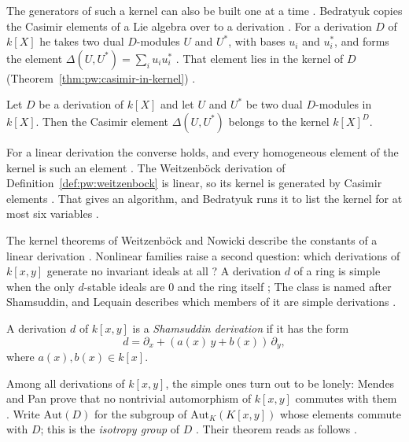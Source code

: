The generators of such a kernel can also be built one at a time
\cite[p.~2]{Bedratyuk2005Casimir}. Bedratyuk copies the Casimir elements of a
Lie algebra over to a derivation \cite[p.~2]{Bedratyuk2005Casimir}. For a
derivation $D$ of $k[X]$ he takes two dual $D$-modules $U$ and $U^{*}$, with
bases $u_{i}$ and $u^{*}_{i}$, and forms the element
$\Delta(U,U^{*})=\sum_{i}u_{i}u^{*}_{i}$ \cite[Definition~2.4,
p.~2]{Bedratyuk2005Casimir}. That element lies in the kernel of $D$
(Theorem~\ref{thm:pw:casimir-in-kernel}) \cite[Theorem~2.2,
p.~2]{Bedratyuk2005Casimir}.

\begin{theorem}\label{thm:pw:casimir-in-kernel}
Let $D$ be a derivation of $k[X]$ and let $U$ and $U^{*}$ be two dual
$D$-modules in $k[X]$. Then the Casimir element $\Delta(U,U^{*})$ belongs to
the kernel $k[X]^{D}$.
\end{theorem}

For a linear derivation the converse holds, and every homogeneous element of
the kernel is such an element
\cite[Theorem~2.3, pp.~2--3]{Bedratyuk2005Casimir}. The Weitzenb\"ock
derivation of Definition~\ref{def:pw:weitzenbock} is linear, so its kernel is
generated by Casimir elements \cite[pp.~3--4]{Bedratyuk2005Casimir}. That
gives an algorithm, and Bedratyuk runs it to list the kernel for at most six
variables \cite[p.~1]{Bedratyuk2005Casimir}.

The kernel theorems of Weitzenb\"ock and Nowicki describe the constants of a
linear derivation \cite[p.~21]{Freudenburg2017}. Nonlinear families raise a second question: which
derivations of $k[x,y]$ generate no invariant ideals at all
\cite[p.~2031]{Baltazar2016}? A derivation $d$ of a ring is simple when the
only $d$-stable ideals are $0$ and the ring itself
\cite[p.~2031]{Baltazar2016}; The class is named after Shamsuddin, and Lequain
describes which members of it are simple derivations
\cite[pp.~801--807]{Lequain2008Simple}.

\begin{definition}\label{def:pw:shamsuddin}
A derivation $d$ of $k[x,y]$ is a \emph{Shamsuddin derivation} if it has
the form
\begin{equation*}
d=\partial_{x}+(a(x)\,y+b(x))\,\partial_{y},
\end{equation*}
where $a(x),b(x)\in k[x]$.
\end{definition}

Among all derivations of $k[x,y]$, the simple ones turn out to be lonely:
Mendes and Pan prove that no nontrivial automorphism of $k[x,y]$ commutes with
them \cite[p.~2]{MendesPan2017}. Write $\mathrm{Aut}(D)$ for the subgroup of
$\mathrm{Aut}_{K}(K[x,y])$ whose elements commute with $D$; this is the
\emph{isotropy group} of $D$ \cite[p.~2]{MendesPan2017}. Their theorem reads
as follows \cite[p.~2]{MendesPan2017}.

